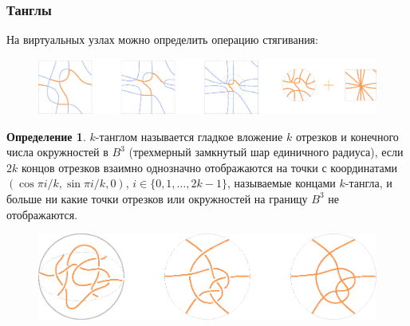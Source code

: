 \documentclass[dvips, intlimits, 9pt, unicode, notheorems, color=usenames,dvipsnames]{beamer}
\theoremstyle{plain}
\theoremstyle{definition}
\newtheorem{definition}{Определение}
\begin{document}
	\begin{frame}
		\frametitle{Танглы}

		На виртуальных узлах можно определить операцию стягивания:
		\begin{figure}[ht]
			\centering
			\includegraphics[scale = 0.4]{c/virtual-contraction.eps}
		\end{figure}

		\begin{definition}
			\label{definition:tangle}
			$k$-танглом называется гладкое вложение $k$ отрезков и конечного числа окружностей в $B^3$
			(трехмерный замкнутый шар единичного радиуса), если $2k$ концов отрезков взаимно однозначно отображаются
			на точки с координатами $(\cos\pi i/k, \sin\pi i/k, 0)$, $i\in\{0, 1, \dots, 2k{-}1\}$, называемые
			концами $k$-тангла, и больше ни какие точки отрезков или окружностей на границу $B^3$ не отображаются.
		\end{definition}

		\begin{figure}[ht]
			\centering
			\includegraphics[scale = 0.6]{c/tangle-diagram-projection.eps}
		\end{figure}
	\end{frame}
\end{document}
